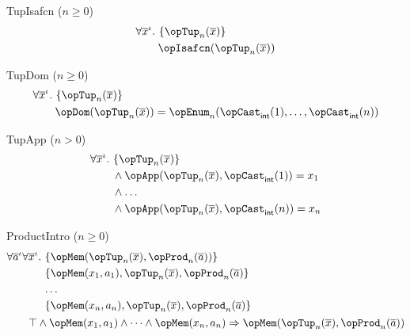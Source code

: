\documentclass[11pt, a4paper, oneside]{article}
\begin{document}
\begin{axioms}
\item[TupIsafcn ($n \ge 0$)] \[
        \begin{aligned}
            &\forall \overline{x}^\idv.\, \st{ \opTup_n(\overline{x}) } \\
            &\qquad \opIsafcn(\opTup_n(\overline{x}))
        \end{aligned}
    \]

\item[TupDom ($n \ge 0$)] \[
        \begin{aligned}
            &\forall \overline{x}^\idv.\, \st{ \opTup_n(\overline{x}) } \\
            &\qquad \opDom(\opTup_n(\overline{x})) = \opEnum_n(\opCast_\int(1), \dots, \opCast_\int(n))
        \end{aligned}
    \]

\item[TupApp ($n > 0$)] \[
        \begin{aligned}
            &\forall \overline{x}^\idv.\, \st{ \opTup_n(\overline{x}) } \\
            &\qquad \wedge \opApp(\opTup_n(\overline{x}), \opCast_\int(1)) = x_1 \\
            &\qquad \wedge \dots \\
            &\qquad \wedge \opApp(\opTup_n(\overline{x}), \opCast_\int(n)) = x_n
        \end{aligned}
    \]

\item[ProductIntro ($n \ge 0$)] \[
        \begin{aligned}
            &\forall \overline{a}^\idv \forall \overline{x}^\idv.\, \begin{aligned}[t]
                &\st{ \opMem(\opTup_n(\overline{x}), \opProd_n(\overline{a})) } \\
                &\st{ \opMem(x_1, a_1), \opTup_n(\overline{x}), \opProd_n(\overline{a}) } \\
                & \dots \\
                &\st{ \opMem(x_n, a_n), \opTup_n(\overline{x}), \opProd_n(\overline{a}) }
            \end{aligned} \\
            &\qquad \top \wedge \opMem(x_1, a_1) \wedge \dots \wedge \opMem(x_n, a_n) \imp \opMem(\opTup_n(\overline{x}), \opProd_n(\overline{a}))
        \end{aligned}
    \]


\end{axioms}
\end{document}
